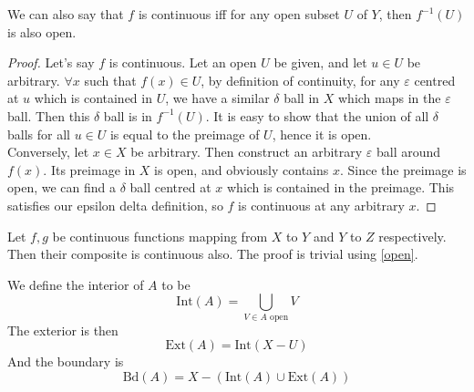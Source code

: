\documentclass[12pt]{article}
\begin{document}
\begin{prop} \label{open}
    We can also say that $f$ is continuous iff for any open subset $U$ of $Y$, then $f^{-1}(U)$ is also open.
\end{prop}

\begin{proof}
    Let's say $f$ is continuous. Let an open $U$ be given, and let $u \in U$ be arbitrary. $\forall x$ such that $f(x) \in U$, by definition of continuity, for any $\varepsilon$ centred at $u$ which is contained in $U$, we have a similar $\delta$ ball in $X$ which maps in the $\varepsilon$ ball. Then this $\delta$ ball is in $f^{-1}(U)$. It is easy to show that the union of all $\delta$ balls for all $u \in U$ is equal to the preimage of $U$, hence it is open. \\
    Conversely, let $x \in X$ be arbitrary. Then construct an arbitrary $\varepsilon$ ball around $f(x)$. Its preimage in $X$ is open, and obviously contains $x$. Since the preimage is open, we can find a $\delta$ ball centred at $x$ which is contained in the preimage. This satisfies our epsilon delta definition, so $f$ is continuous at any arbitrary $x$.
\end{proof}

\begin{rem}
    Let $f,g$ be continuous functions mapping from $X$ to $Y$ and $Y$ to $Z$ respectively. Then their composite is continuous also. The proof is trivial using \ref{open}.
\end{rem}

\begin{defn}
    We define the interior of $A$ to be
    $$\text{Int}(A) = \bigcup_{V \in A\text{ open}} V$$
    The exterior is then
    $$\text{Ext}(A) = \text{Int}(X-U)$$
    And the boundary is
    $$\text{Bd}(A) = X - (\text{Int}(A) \cup \text{Ext}(A))$$
\end{defn}
\end{document}
